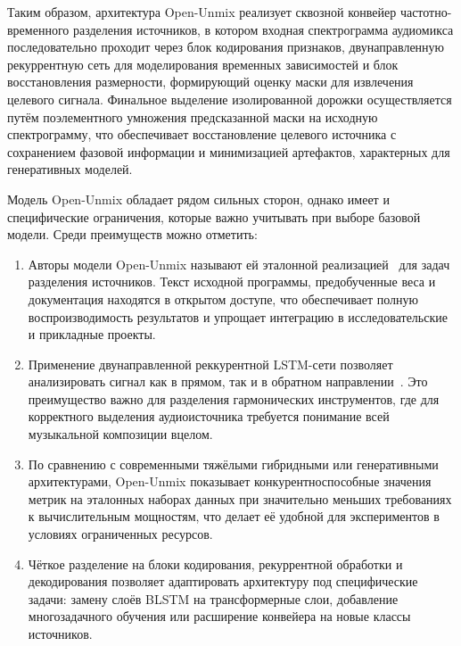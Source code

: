 \documentclass[14pt]{extarticle}
\begin{document}
Таким образом, архитектура Open-Unmix реализует сквозной конвейер частотно-временного разделения 
источников, в котором входная спектрограмма аудиомикса последовательно проходит через блок кодирования признаков, 
двунаправленную рекуррентную сеть для моделирования временных зависимостей и блок восстановления размерности, 
формирующий оценку маски для извлечения целевого сигнала. 
Финальное выделение изолированной дорожки осуществляется путём поэлементного умножения 
предсказанной маски на исходную спектрограмму, что обеспечивает восстановление целевого источника с сохранением фазовой информации и минимизацией 
артефактов, характерных для генеративных моделей.

Модель Open-Unmix  обладает рядом сильных сторон, однако имеет и специфические ограничения, которые важно учитывать при выборе базовой модели. 
Среди преимуществ можно отметить:
\begin{enumerate}[label=\arabic*)]
	\item Авторы модели Open-Unmix называют ей эталонной 
	реализацией~\cite{openunmix} для задач разделения источников. 
	Текст исходной программы, предобученные веса и документация находятся в открытом доступе, что обеспечивает полную воспроизводимость 
	результатов и упрощает интеграцию в исследовательские и прикладные проекты.
	\item Применение двунаправленной реккурентной LSTM-сети позволяет анализировать сигнал 
	как в прямом, так и в обратном направлении~\cite{BLSTM}.
	Это преимущество важно для разделения гармонических инструментов, где для корректного выделения аудиоисточника требуется понимание 
	всей музыкальной композиции вцелом.
	\item По сравнению с современными тяжёлыми гибридными 
	или генеративными архитектурами, Open-Unmix показывает конкурентноспособные значения метрик на эталонных наборах данных 
	при значительно меньших требованиях к вычислительным мощностям, что делает её удобной для экспериментов в условиях ограниченных ресурсов.
	\item Чёткое разделение на блоки кодирования, рекуррентной обработки и декодирования 
	позволяет адаптировать архитектуру под специфические задачи: замену слоёв BLSTM на трансформерные слои, добавление многозадачного
	обучения или расширение конвейера на новые классы источников.
\end{enumerate}
\end{document}
